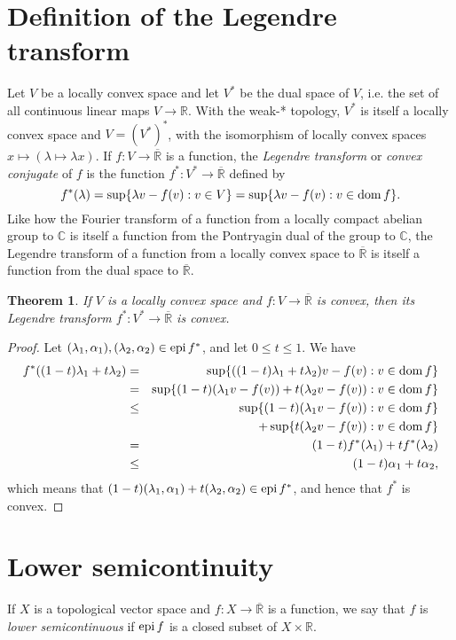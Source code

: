\documentclass{article}
\newcommand{\epi}{\ensuremath\mathrm{epi}\,}
\newcommand{\dom}{\ensuremath\mathrm{dom}\,}
\newcommand{\extreals}{\overline{\mathbb{R}}}
\newtheorem{theorem}{Theorem}
\theoremstyle{definition}
\begin{document}
\section{Definition of the Legendre transform}
Let $V$ be a locally convex space and let $V^*$ be the dual space of $V$, i.e. the set of all continuous linear maps
$V \to \mathbb{R}$. With the weak-* topology, $V^*$ is itself a locally convex space and $V=(V^*)^*$, with the  isomorphism
of locally convex spaces $x \mapsto (\lambda \mapsto \lambda x)$.
If $f:V \to \extreals$ is a function, the {\em Legendre transform}  or  {\em convex conjugate} of $f$
is the function $f^*:V^* \to \extreals$ defined by
\[
f^*(\lambda) = \sup \{\lambda v - f(v):v \in V\} = \sup\{\lambda v-f(v):v \in \dom f\}.
\]
Like how the Fourier transform of a function from a locally compact abelian group to $\mathbb{C}$ is itself a function
from the Pontryagin dual of the group to $\mathbb{C}$, the Legendre transform of a function from a locally convex space to $\extreals$ is
itself a function from the dual space to $\extreals$.




\begin{theorem}
If $V$ is a locally convex space and $f:V \to \extreals$ is convex, then its Legendre transform
$f^*:V^* \to \extreals$ is convex.
\label{legendreconvex}
\end{theorem}
\begin{proof}
Let $(\lambda_1,\alpha_1),(\lambda_2,\alpha_2) \in \epi f^*$, and let $0 \leq t \leq 1$. 
We have
 \begin{eqnarray*}
f^*((1-t)\lambda_1+t\lambda_2)&=&\sup\{((1-t)\lambda_1+t\lambda_2)v-f(v):v \in \dom f\}\\
&=&\sup\{(1-t)(\lambda_1 v-f(v))+t(\lambda_2 v-f(v)):v \in \dom f\}\\
&\leq&\sup\{(1-t)(\lambda_1 v-f(v)): v\in \dom f\}\\
&&+\sup\{t(\lambda_2 v-f(v)):v \in \dom f\}\\
&=&(1-t)f^*(\lambda_1)+tf^*(\lambda_2)\\
&\leq&(1-t)\alpha_1+t\alpha_2,
 \end{eqnarray*}
 which means that $(1-t)(\lambda_1,\alpha_1)+t(\lambda_2,\alpha_2) \in \epi f^*$, and hence that $f^*$ is convex.
\end{proof}


\section{Lower semicontinuity}
If $X$ is a topological vector space and $f:X \to \extreals$ is a function, we say that $f$ is {\em lower semicontinuous} if $\epi f$ is a closed subset
of $X \times \mathbb{R}$. 
\end{document}
